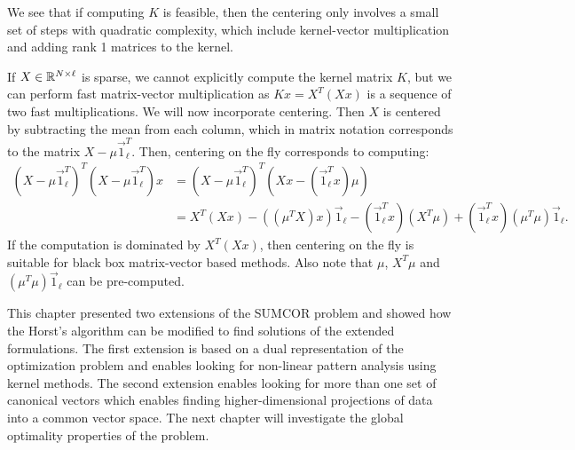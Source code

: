 We see that if computing $K$ is feasible, then the centering only involves a small set of
steps with quadratic complexity, which include kernel-vector multiplication and adding rank 1 matrices to the kernel.

If $X \in \mathbb{R}^{N \times \ell}$ is sparse, we cannot explicitly compute the kernel matrix
$K$, but we can perform fast matrix-vector multiplication as $K x = X^T(X x)$
is a sequence of two fast multiplications. We will now incorporate centering.
Then $X$ is centered by subtracting the mean from each column, which in matrix notation corresponds to
the matrix $X - \mu \vec{1}_\ell^T$.
Then, centering on the fly corresponds to computing:
\begin{align}
(X - \mu \vec{1}_\ell^T)^T (X - \mu \vec{1}_\ell^T) x & = (X - \mu \vec{1}_\ell^T)^T (X x - (\vec{1}_\ell^T x) \mu ) \nonumber \\ 
& = X^T (X x)  - ((\mu^T X) x) \vec{1}_\ell - (\vec{1}_\ell^T x) (X^T \mu)
+  (\vec{1}_\ell^T  x)(\mu^T \mu) \vec{1}_\ell . \nonumber
\end{align}
If the computation is dominated by $X^T (X x)$, then centering on the fly is
suitable for black box matrix-vector based methods.
Also note that $\mu$, $X^T\mu$ and $(\mu^T \mu) \vec{1}_\ell$ can be pre-computed.

This chapter presented two extensions of the SUMCOR problem and showed how the Horst's algorithm can be modified to find solutions of
the extended formulations. The first extension is based on a dual representation of the optimization problem and enables looking for
non-linear pattern analysis using kernel methods. The second extension enables looking for more than one set of canonical vectors which
enables finding higher-dimensional projections of data into a common vector space. The next chapter will investigate the global optimality
properties of the problem.
